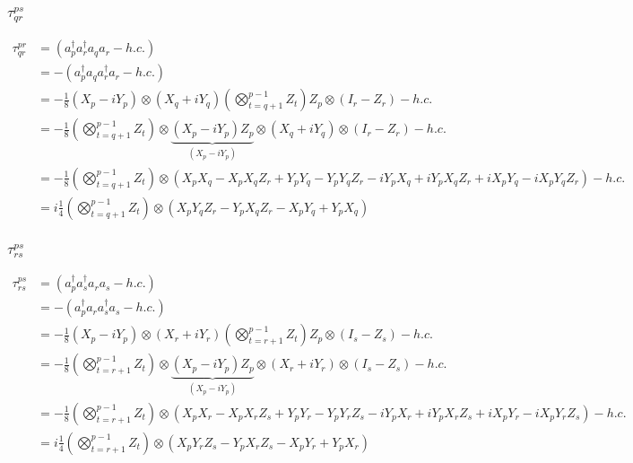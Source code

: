 \documentclass[prb,amsmath,amsfonts,amssymb]{revtex4}
\begin{document}
\subsubsection{$\tau^{ps}_{qr}$}
\begin{align}
	\tau^{pr}_{qr} &=   \left(a^\dag_p a^\dag_r a_q a_r - h.c.\right) \nonumber\\
	&=  -  \left(a^\dag_p a_q a^\dag_r a_r  - h.c.\right)\nonumber\\
	&= -\frac{1}{8} (X_p - iY	_p)\otimes (X_q + iY_q) \left(\bigotimes_{t=q+1}^{p-1}Z_t \right) Z_p \otimes \left(I_r - Z_r\right)   -h.c.
	\nonumber\\
	&= -\frac{1}{8} \left(\bigotimes_{t=q+1}^{p-1}Z_t \right)  \otimes \underbrace{(X_p - iY_p) Z_p}_{(X_p - iY_p)} \otimes(X_q + iY_q) \otimes (I_r - Z_r) -h.c.\nonumber\\
	&= -\frac{1}{8} \left(\bigotimes_{t=q+1}^{p-1}Z_t \right)  \otimes \left(X_p X_q - X_p  X_q Z_r + Y_p Y_q - Y_p  Y_q Z_r -iY_p X_q +iY_p  X_q Z_r +iX_p Y_q - i X_p  Y_q Z_r\right) -h.c.\nonumber\\	
	&= i\frac{1}{4} \left(\bigotimes_{t=q+1}^{p-1}Z_t \right)  \otimes \left(X_p Y_q Z_r -Y_p X_q Z_r -X_p Y_q +Y_p X_q  \right) 
\end{align}
\fi
\subsubsection{$\tau^{ps}_{rs}$}
\begin{align}
	\tau^{ps}_{rs} &= \left(a^\dag_p a^\dag_s a_r a_s - h.c.\right) \nonumber\\
	&=  -  \left(a^\dag_p a_r a^\dag_s a_s  - h.c.\right)\nonumber\\
	&= -\frac{1}{8} (X_p - iY	_p)\otimes (X_r + iY_r) \left(\bigotimes_{t=r+1}^{p-1}Z_t \right) Z_p \otimes \left(I_s - Z_s\right)   -h.c.
	\nonumber\\
	&= -\frac{1}{8} \left(\bigotimes_{t=r+1}^{p-1}Z_t \right)  \otimes \underbrace{(X_p - iY_p) Z_p}_{(X_p - iY_p)} \otimes(X_r + iY_r) \otimes (I_s - Z_s) -h.c.\nonumber\\
	&= -\frac{1}{8} \left(\bigotimes_{t=r+1}^{p-1}Z_t \right)  \otimes \left(X_p X_r - X_p  X_r Z_s + Y_p Y_r - Y_p  Y_r Z_s -iY_p X_r +iY_p  X_r Z_s +iX_p Y_r - i X_p  Y_r Z_s\right) -h.c.\nonumber\\	
	&= i\frac{1}{4} \left(\bigotimes_{t=r+1}^{p-1}Z_t \right)  \otimes \left(X_p Y_r Z_s -Y_p X_r Z_s -X_p Y_r +Y_p X_r  \right) 
\end{align}
\end{document}
